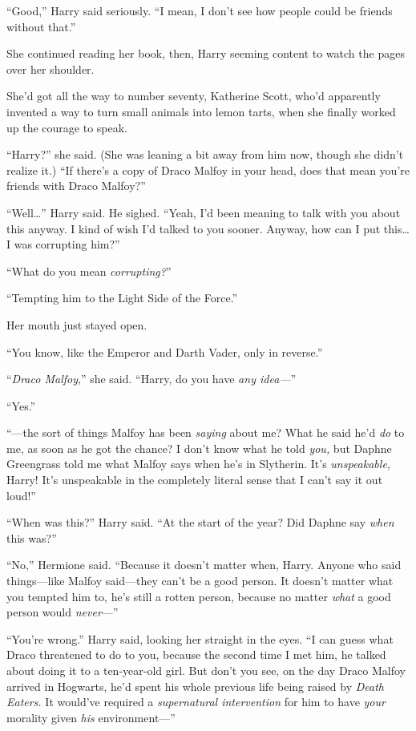 “Good,” Harry said seriously. “I mean, I don’t see how people could be friends without that.”

She continued reading her book, then, Harry seeming content to watch the pages over her shoulder.

She’d got all the way to number seventy, Katherine Scott, who’d apparently invented a way to turn small animals into lemon tarts, when she finally worked up the courage to speak.

“Harry?” she said. (She was leaning a bit away from him now, though she didn’t realize it.) “If there’s a copy of Draco Malfoy in your head, does that mean you’re friends with Draco Malfoy?”

“Well…” Harry said. He sighed. “Yeah, I’d been meaning to talk with you about this anyway. I kind of wish I’d talked to you sooner. Anyway, how can I put this…I was corrupting him?”

“What do you mean \emph{corrupting?}”

“Tempting him to the Light Side of the Force.”

Her mouth just stayed open.

“You know, like the Emperor and Darth Vader, only in reverse.”

“\emph{Draco Malfoy},” she said. “Harry, do you have \emph{any idea—}”

“Yes.”

“—the sort of things Malfoy has been \emph{saying} about me? What he said he’d \emph{do} to me, as soon as he got the chance? I don’t know what he told \emph{you,} but Daphne Greengrass told me what Malfoy says when he’s in Slytherin. It’s \emph{unspeakable,} Harry! It’s unspeakable in the completely literal sense that I can’t say it out loud!”

“When was this?” Harry said. “At the start of the year? Did Daphne say \emph{when} this was?”

“No,” Hermione said. “Because it doesn’t matter when, Harry. Anyone who said things—like Malfoy said—they can’t be a good person. It doesn’t matter what you tempted him to, he’s still a rotten person, because no matter \emph{what} a good person would \emph{never}—”

“You’re wrong.” Harry said, looking her straight in the eyes. “I can guess what Draco threatened to do to you, because the second time I met him, he talked about doing it to a ten-year-old girl. But don’t you see, on the day Draco Malfoy arrived in Hogwarts, he’d spent his whole previous life being raised by \emph{Death Eaters.} It would’ve required a \emph{supernatural intervention} for him to have \emph{your} morality given \emph{his} environment—”

